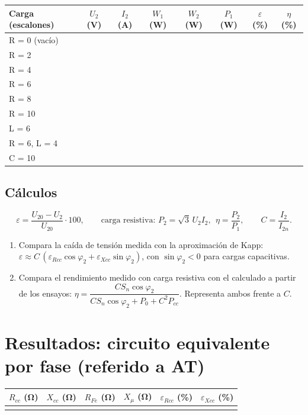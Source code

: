 \documentclass[11pt,a4paper]{article}
\begin{document}
\begin{tabularx}{\textwidth}{|l|C|C|C|C|C|C|C|}
  \hline
  Carga (escalones) & $U_2$ (V) & $I_2$ (A) & $W_1$ (W) & $W_2$ (W) & $P_1$ (W) & $\varepsilon$ (\%) & $\eta$ (\%) \\ \hline
  R = 0 (vacío) & & & & & & & \\ \hline
  R = 2 & & & & & & & \\ \hline
  R = 4 & & & & & & & \\ \hline
  R = 6 & & & & & & & \\ \hline
  R = 8 & & & & & & & \\ \hline
  R = 10 & & & & & & & \\ \hline
  L = 6 & & & & & & & \\ \hline
  R = 6, L = 4 & & & & & & & \\ \hline
  C = 10 & & & & & & & \\ \hline
\end{tabularx}

\subsection*{Cálculos}
\[
  \varepsilon = \frac{U_{20} - U_2}{U_{20}}\cdot 100, \qquad
  \text{carga resistiva: } P_2 = \sqrt3\,U_2 I_2,\ \ \eta = \frac{P_2}{P_1}, \qquad
  C = \frac{I_2}{I_{2n}}.
\]
\begin{enumerate}
  \item Compara la caída de tensión medida con la aproximación de Kapp: $\varepsilon \approx C\,(\varepsilon_{Rcc}\cos\varphi_2 + \varepsilon_{Xcc}\sin\varphi_2)$, con $\sin\varphi_2 < 0$ para cargas capacitivas.
  \item Compara el rendimiento medido con carga resistiva con el calculado a partir de los ensayos: $\eta = \dfrac{C S_n\cos\varphi_2}{C S_n\cos\varphi_2 + P_0 + C^2 P_{cc}}$. Representa ambos frente a $C$.
\end{enumerate}

\section{Resultados: circuito equivalente por fase (referido a AT)}
\begin{tabularx}{\textwidth}{|C|C|C|C|C|C|}
  \hline
  $R_{cc}$ (Ω) & $X_{cc}$ (Ω) & $R_{Fe}$ (Ω) & $X_\mu$ (Ω) & $\varepsilon_{Rcc}$ (\%) & $\varepsilon_{Xcc}$ (\%) \\ \hline
  & & & & & \\[8pt] \hline
\end{tabularx}
\end{document}
